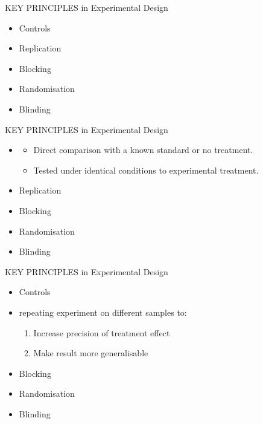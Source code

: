 \documentclass{beamer}
\begin{document}
\begin{frame}{KEY PRINCIPLES in Experimental Design}

\begin{alertblock}{}
 \begin{itemize}
  \item Controls
  \item Replication
  \item Blocking
  \item Randomisation
  \item Blinding
 \end{itemize}

\end{alertblock}

\end{frame}


\begin{frame}{KEY PRINCIPLES in Experimental Design}

\begin{alertblock}{}
 \begin{itemize}
  \item {\color{red}{Controls}}
    \begin{itemize}
     \item Direct comparison with a known standard or no treatment.
      \item Tested under identical conditions to experimental treatment.
    \end{itemize}
  \item Replication
  \item Blocking
  \item Randomisation
  \item Blinding
 \end{itemize}

\end{alertblock}

\end{frame}


\begin{frame}{KEY PRINCIPLES in Experimental Design}

\begin{alertblock}{}
 \begin{itemize}
  \item Controls
  \item {\color{red}{Replication}} repeating experiment on different samples to: 
    \begin{enumerate}
      \item Increase precision of treatment effect
      \item Make result more generalisable
    \end{enumerate}
  \item Blocking
  \item Randomisation
  \item Blinding
 \end{itemize}

\end{alertblock}

\end{frame}
\end{document}
